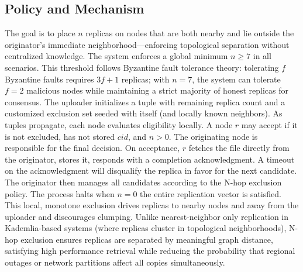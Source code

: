 \documentclass[runningheads]{llncs}
\begin{document}
\subsection{Policy and Mechanism}
The goal is to place \(n\) replicas on nodes that are both nearby and lie outside the originator's immediate neighborhood—enforcing topological separation without centralized knowledge. The system enforces a global minimum \(n\ge 7\) in all scenarios. This threshold follows Byzantine fault tolerance theory: tolerating \(f\) Byzantine faults requires \(3f+1\) replicas; with \(n=7\), the system can tolerate \(f=2\) malicious nodes while maintaining a strict majority of honest replicas for consensus. The uploader initializes a tuple with remaining replica count and a customized exclusion set seeded with itself (and locally known neighbors). As tuples propagate, each node evaluates eligibility locally. A node \(r\) may accept if it is not excluded, has not stored \(\mathit{cid}\), and \(n>0\). The originating node is responsible for the final decision. On acceptance, \(r\) fetches the file directly from the originator, stores it, responds with a completion acknowledgment. A timeout on the acknowledgment will disqualify the replica in favor for the next candidate. The originator then manages all candidates according to the N-hop exclusion policy. The process halts when \(n=0\) the entire replication vector is satisfied. This local, monotone exclusion drives replicas to nearby nodes and away from the uploader and discourages clumping. Unlike nearest-neighbor only replication in Kademlia-based systems (where replicas cluster in topological neighborhoods), N-hop exclusion ensures replicas are separated by meaningful graph distance, satisfying high performance retrieval while reducing the probability that regional outages or network partitions affect all copies simultaneously.
\end{document}
